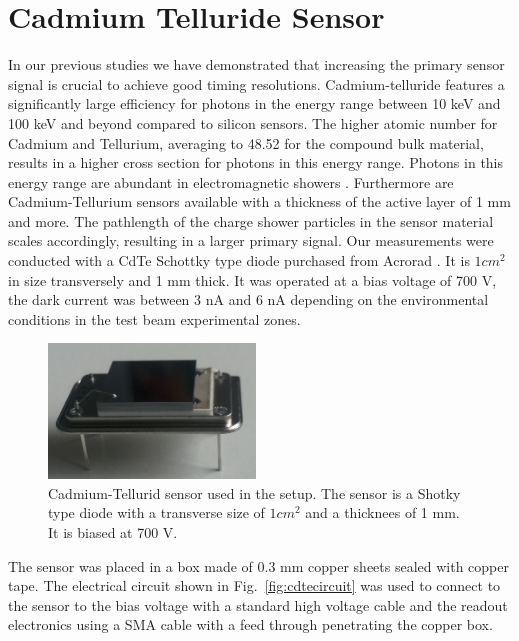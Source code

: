 %
%
%
\section{Cadmium Telluride Sensor}
\label{sec:siliconpad}

In our previous studies \cite{Anderson:2015gha,Ronzhin:2015pba,MCPShowerMaxPaper,Ronzhin2015288,Ronzhin201552,SiliconTiming} we have demonstrated that increasing the primary sensor signal is crucial to achieve good timing resolutions.  
Cadmium-telluride features a significantly large efficiency for photons in the energy range between 10 keV and 100 keV and beyond compared to silicon sensors. The higher atomic number for Cadmium and Tellurium, averaging to 48.52 for the compound bulk material, results in a higher cross section for photons in this energy range. 
Photons in this energy range are abundant in electromagnetic showers \cite{showercomposition}. 
Furthermore are Cadmium-Tellurium sensors available with a thickness of the active layer of 1 mm and more. The pathlength of the charge shower particles in the sensor material scales accordingly, resulting in a larger primary signal.   
%
Our measurements were conducted with a CdTe Schottky type diode purchased from Acrorad \cite{acrorad}. It is $1 cm^2$ in size transversely and 1 mm thick.
It was operated at a bias voltage of 700 V, the dark current was between 3 nA and 6 nA depending on the environmental conditions in the test beam experimental zones.     
%
\begin{figure}[htbp] 
\centering
\includegraphics[width=0.49\textwidth]{figures/CdTeSensor.png} 
\caption{Cadmium-Tellurid sensor used in the setup. The sensor is a Shotky type diode with a transverse size of $1 cm^2$ and a thicknees of 1 mm. It is biased at 700 V.} 
\label{fig:CdTeSensor} 
\end{figure} 
%
The sensor was placed in a box made of 0.3 mm copper sheets sealed with copper tape. 
The electrical circuit shown in Fig.~\ref{fig:cdtecircuit} was used to connect to the sensor to the bias voltage with a standard high voltage cable and the readout electronics using a SMA cable with a feed through penetrating the copper box.
